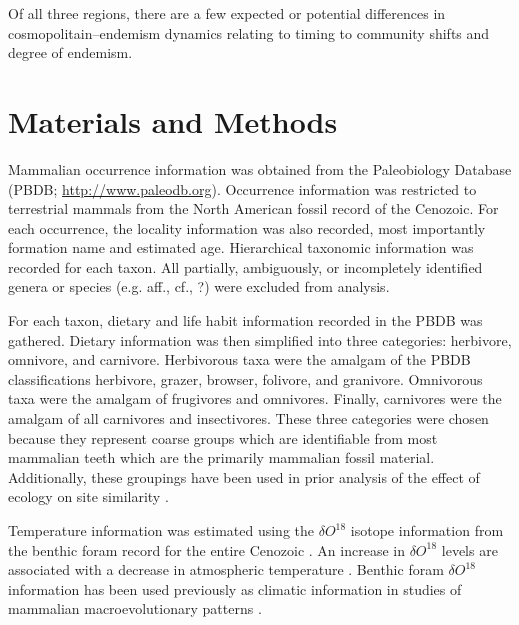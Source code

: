 \documentclass[12pt,letterpaper]{article}
\begin{document}
Of all three regions, there are a few expected or potential differences in cosmopolitain--endemism dynamics relating to timing to community shifts and degree of endemism.



\section{Materials and Methods}
Mammalian occurrence information was obtained from the Paleobiology Database (PBDB; \url{http://www.paleodb.org}). Occurrence information was restricted to terrestrial mammals from the North American fossil record of the Cenozoic. For each occurrence, the locality information was also recorded, most importantly formation name and estimated age. Hierarchical taxonomic information was recorded for each taxon. All partially, ambiguously, or incompletely identified genera or species (e.g. aff., cf., ?) were excluded from analysis. 


For each taxon, dietary and life habit information recorded in the PBDB was gathered. Dietary information was then simplified into three categories: herbivore, omnivore, and carnivore. Herbivorous taxa were the amalgam of the PBDB classifications herbivore, grazer, browser, folivore, and granivore. Omnivorous taxa were the amalgam of frugivores and omnivores. Finally, carnivores were the amalgam of all carnivores and insectivores. These three categories were chosen because they represent coarse groups which are identifiable from most mammalian teeth which are the primarily mammalian fossil material. Additionally, these groupings have been used in prior analysis of the effect of ecology on site similarity \citep{Jernvall2004}.

Temperature information was estimated using the \(\delta O^{18}\) isotope information from the benthic foram record for the entire Cenozoic \citep{Zachos2008}. An increase in \(\delta O^{18}\) levels are associated with a decrease in atmospheric temperature \citep{Zachos2001,Zachos2008}. Benthic foram \(\delta O^{18}\) information has been used previously as climatic information in studies of mammalian macroevolutionary patterns \citep{Alroy2000g,Figueirido2012,Rose2011}.
%
%
\end{document}
